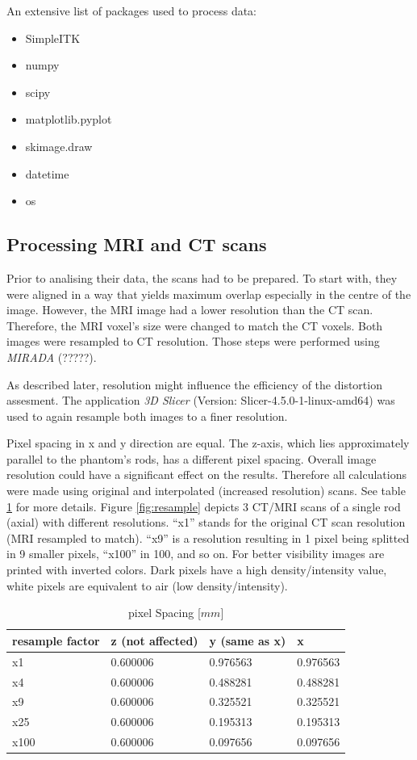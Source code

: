 \documentclass[parskip,bibtotoc,final,twoside=false,titlepage,a4paper,english,12pt,titlepage,a4paper]{scrbook}
\begin{document}
An extensive list of packages used to process data:
\begin{itemize}
 \item SimpleITK
 \item numpy
 \item scipy
 \item matplotlib.pyplot \cite{Hunter2007}
 \item skimage.draw
 \item datetime
 \item os
\end{itemize}

\subsection{Processing MRI and CT scans}

Prior to analising their data, the scans had to be prepared.
To start with, they were aligned in a way that yields maximum overlap especially in the centre of the image.
However, the MRI image had a lower resolution than the CT scan.
Therefore, the MRI voxel's size were changed to match the CT voxels. Both images were resampled to CT resolution.
Those steps were performed using \textit{MIRADA} (?????).

As described later, resolution might influence the efficiency of the distortion assesment.
The application \textit{3D Slicer} (Version: Slicer-4.5.0-1-linux-amd64) was used to again resample both images to a finer resolution.

Pixel spacing in x and y direction are equal. The z-axis, which lies approximately parallel to the phantom's rods, has a different pixel spacing.
Overall image resolution could have a significant effect on the results. Therefore all calculations were made using original and interpolated (increased resolution) scans.
See table \ref{tab:spacing} for more details. Figure \ref{fig:resample} depicts 3 CT/MRI scans of a single rod (axial) with different resolutions.
``x1'' stands for the original CT scan resolution (MRI resampled to match).
``x9'' is a resolution resulting in 1 pixel being splitted in 9 smaller pixels, ``x100'' in 100, and so on.
For better visibility images are printed with inverted colors. Dark pixels have a high density/intensity value, white pixels are equivalent to air (low density/intensity).

\begin{table}[!htb]
\centering
\begin{tabular}{l|l|l|l}
resample factor  & z (not affected) &  y (same as x) & x \\
\toprule
x1     & 0.600006 & 0.976563	& 0.976563	\\
x4     & 0.600006 & 0.488281	& 0.488281	\\
x9     & 0.600006 & 0.325521	& 0.325521	\\
x25    & 0.600006 & 0.195313	& 0.195313	\\
x100   & 0.600006 & 0.097656	& 0.097656
\end{tabular}
\caption{pixel Spacing [$mm$]}
\label{tab:spacing}
\end{table}
\end{document}
